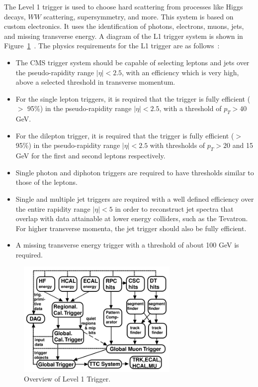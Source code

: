 The Level 1 trigger is used to choose hard scattering from processes like Higgs decays, $WW$ scattering, supersymmetry, and more.  This system is based on custom electronics.  It uses the identification of photons, electrons, muons, jets, and missing transverse energy. A diagram of the L1 trigger system is shown in Figure~\ref{fig:l1triggeroverview}~\cite{Bayatyan:706847}. The physics requirements for the L1 trigger are as follows~\cite{Bayatyan:706847}:
\begin{itemize}
  \item
    The CMS trigger system should be capable of selecting leptons and jets over the pseudo-rapidity range $|\eta| < 2.5$, with an efficiency which is very high, above a selected threshold in transverse momentum.
  \item
    For the single lepton triggers, it is required that the trigger is fully efficient ($>$ 95\%) in the pseudo-rapidity range $|\eta| < 2.5$, with a threshold of $p_T> 40$ GeV.
  \item
    For the dilepton trigger, it is required that the trigger is fully efficient ($>$ 95\%) in the pseudo-rapidity range $|\eta| < 2.5$ with thresholds of $p_T> 20$ and 15 GeV for the first and second leptons respectively.
  \item
    Single photon and diphoton triggers are required to have thresholds similar to those of the leptons.
  \item
    Single and multiple jet triggers are required with a well defined efficiency over the entire rapidity range $|\eta| < 5$ in order to reconstruct jet spectra that overlap with data attainable at lower energy colliders, such as the Tevatron. For higher transverse momenta, the jet trigger should also be fully efficient.
  \item
    A missing transverse energy trigger with a threshold of about 100 GeV is required.
\end{itemize}

\begin{figure}[htb]
\centering
\includegraphics[width=0.69\textwidth]{Experiment/l1trigger.pdf}
\caption{Overview of Level 1 Trigger.~\cite{Bayatyan:706847}}
\label{fig:l1triggeroverview}
\end{figure}

